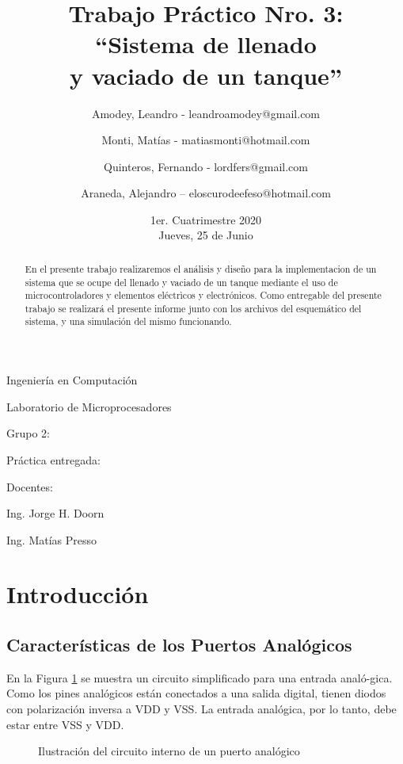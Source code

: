 \documentclass[a4paper]{article}
\title{Trabajo Práctico Nro. 3:\\``Sistema de llenado\\y vaciado de un tanque''}
\author{Amodey, Leandro - leandroamodey@gmail.com
\and Monti, Matías - matiasmonti@hotmail.com
\and Quinteros, Fernando - lordfers@gmail.com
\and Araneda, Alejandro – eloscurodeefeso@hotmail.com}
\date{1er. Cuatrimestre 2020\\Jueves, 25 de Junio}
\def\teacher{Ing. Jorge H. Doorn
\and Ing. Matías Presso}
\begin{document}

\begin{titlepage}\renewcommand\and\par\centering\makeatletter
    {\Large Ingeniería en Computación \par}\vspace{0.5cm}
    {\LARGE Laboratorio de Microprocesadores \par}\vfill
    {\huge \@title \par}\vfill
    Grupo 2:\par
    \@author\vfill
    Práctica entregada:\par
    \@date\vfill
    Docentes:\par
    \teacher\vspace{1cm}\makeatother
\end{titlepage}

\begin{abstract}

    En el presente trabajo realizaremos el análisis y diseño para la implementacion
    de un sistema que se ocupe del llenado y vaciado de un tanque mediante el uso de 
    microcontroladores y elementos eléctrìcos y electrónicos.
    Como entregable del presente trabajo se realizará el presente informe junto con los archivos 
    del esquemático del sistema, y una simulación del mismo funcionando.

\end{abstract}

\section{Introducción}


\subsection*{Características de los Puertos Analógicos}

En la Figura \ref{fig:analog-pin} se muestra un circuito simplificado
para una entrada analó-gica. Como los pines analógicos están conectados
a una salida digital, tienen diodos con polarización inversa a VDD y 
VSS. La entrada analógica, por lo tanto, debe estar entre VSS y VDD.

\begin{figure}[h]\centering
    \caption{Ilustración del circuito interno de un puerto analógico}
    \label{fig:analog-pin}
\end{figure}
\end{document}
